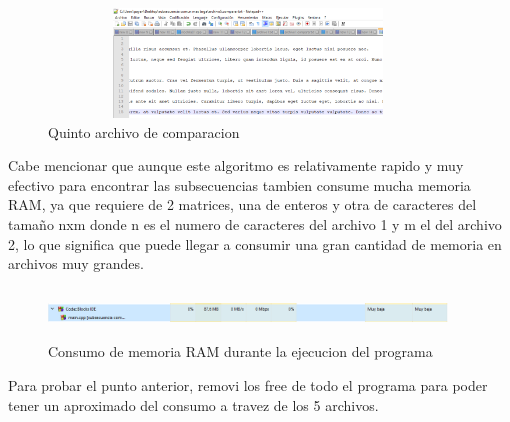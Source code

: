 \documentclass[spanish]{article}
\begin{document}
	\begin{figure}[H]
		\centering
		\includegraphics[width=400px,height=110px]{captura15}
		\caption{Quinto archivo de comparacion}
	\end{figure}
	Cabe mencionar que aunque este algoritmo es relativamente rapido y muy efectivo para encontrar las subsecuencias tambien consume mucha memoria RAM, ya que requiere de 2 matrices, una de enteros y otra de caracteres del tamaño nxm donde n es el numero de caracteres del archivo 1 y m el del archivo 2, lo que significa que puede llegar a consumir una gran cantidad de memoria en archivos muy grandes.\\
	\begin{figure}[H]
		\centering
		\includegraphics[width=400px,height=50px]{captura16}
		\caption{Consumo de memoria RAM durante la ejecucion del programa}
	\end{figure}
	Para probar el punto anterior, removi los free de todo el programa para poder tener un aproximado del consumo a travez de los 5 archivos.\\
\end{document}
